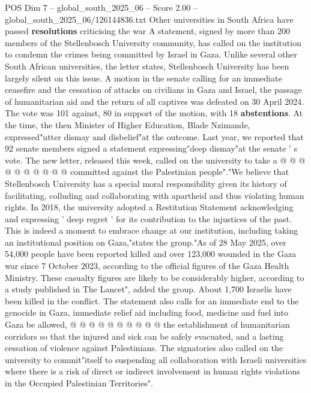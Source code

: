 \begin{textsample}{POS Dim 7 – global\_south\_2025\_06 – Score 2.00 – global\_south\_2025\_06/126144836.txt}  \label{ex:f7_pos_178}
Other universities in South Africa have passed \textbf{resolutions} criticising the war A statement, signed by more than 200 members of the Stellenbosch University community, has called on the institution to condemn the crimes being committed by Israel in Gaza.
Unlike several other South African universities, the letter states, Stellenbosch University has been largely silent on this issue.
A motion in the senate calling for an immediate ceasefire and the cessation of attacks on civilians in Gaza and Israel, the passage of humanitarian aid and the return of all captives was defeated on 30 April 2024.
The vote was 101 against, 80 in support of the motion, with 18 \textbf{abstentions}.
At the time, the then Minister of Higher Education, Blade Nzimande, expressed"utter dismay and disbelief"at the outcome.
Last year, we reported that 92 senate members signed a statement expressing"deep dismay"at the senate ' s vote.
The new letter, released this week, called on the university to take a @ @ @ @ @ @ @ @ @ @ committed against the Palestinian people"."We believe that Stellenbosch University has a special moral responsibility given its history of facilitating, colluding and collaborating with apartheid and thus violating human rights.
In 2018, the university adopted a Restitution Statement acknowledging and expressing ' deep regret ' for its contribution to the injustices of the past.
This is indeed a moment to embrace change at our institution, including taking an institutional position on Gaza,"states the group."As of 28 May 2025, over 54,000 people have been reported killed and over 123,000 wounded in the Gaza war since 7 October 2023, according to the official figures of the Gaza Health Ministry.
These casualty figures are likely to be considerably higher, according to a study published in The Lancet", added the group.
About 1,700 Israelis have been killed in the conflict.
The statement also calls for an immediate end to the genocide in Gaza, immediate relief aid including food, medicine and fuel into Gaza be allowed, @ @ @ @ @ @ @ @ @ @ the establishment of humanitarian corridors so that the injured and sick can be safely evacuated, and a lasting cessation of violence against Palestinians.
The signatories also called on the university to commit"itself to suspending all collaboration with Israeli universities where there is a risk of direct or indirect involvement in human rights violations in the Occupied Palestinian Territories".

\end{textsample}
